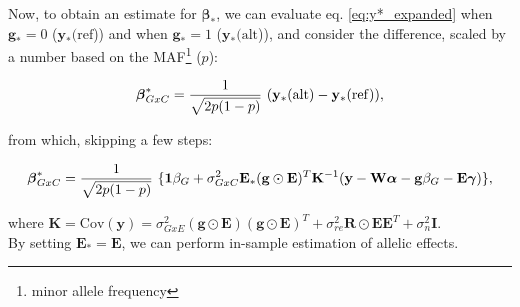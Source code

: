 


Now, to obtain an estimate for $\boldsymbol{\beta}_*$, we can evaluate eq. \eqref{eq:y*_expanded} when $\mathbf{g}_*=0$ ($\mathbf{y}_*(\mathrm{ref}$)) and when $\mathbf{g}_*=1$ ($\mathbf{y}_*(\mathrm{alt}$)), and consider the difference, scaled by a number based on the MAF\footnote{minor allele frequency} ($p$):

\begin{equation}
    \boldsymbol{\beta}_{GxC}^* = \frac{1}{\sqrt{2p(1-p)}} \ (\mathbf{y}_*(\mathrm{alt}) - \mathbf{y}_*(\mathrm{ref})),
\end{equation}

from which, skipping a few steps:

\begin{align}
    \boldsymbol{\beta}_{GxC}^* = \frac{1}{\sqrt{2p(1-p)}} \ \{\mathbf{1}\beta_G + \sigma_{GxC}^2\mathbf{E}_*(\mathbf{g}\odot\mathbf{E})^T \mathbf{K}^{-1}(\mathbf{y}-\mathbf{W}\boldsymbol{\alpha} - \mathbf{g} \beta_G - \mathbf{E} \boldsymbol{\gamma})\},
\end{align}

where $\mathbf{K} = \mathrm{Cov}(\mathbf{y}) = \sigma_{GxE}^2(\mathbf{g}\odot\mathbf{E})(\mathbf{g}\odot\mathbf{E})^T + \sigma_{re}^2 \mathbf{R} \odot \mathbf{E}\mathbf{E}^T + \sigma_n^2 \mathbf{I}$. \\

By setting $\mathbf{E}_* = \mathbf{E}$, we can perform in-sample estimation of allelic effects.





